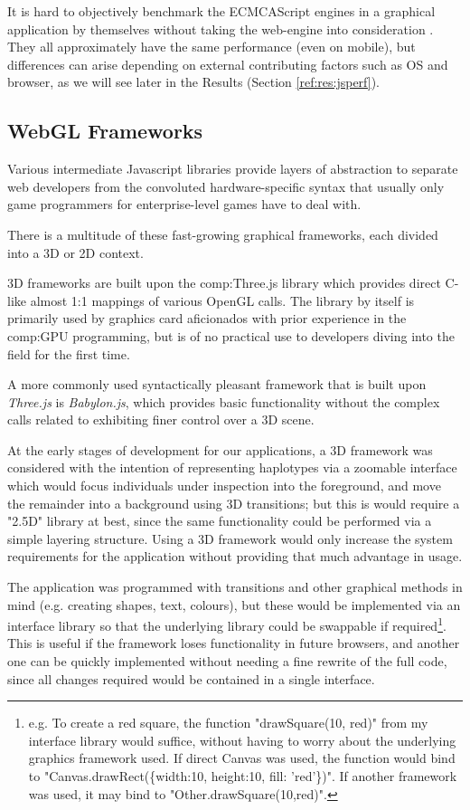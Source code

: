 It is hard to objectively benchmark the ECMCAScript engines in a graphical application by themselves without taking the web-engine into consideration \cite{nielson2008benchmarking}. They all approximately have the same performance (even on mobile)\cite{charland2011mobile}, but differences can arise depending on external contributing factors such as OS and browser, as we will see later in the Results (Section \ref{ref:res:jsperf}).


\subsection{WebGL Frameworks}

Various intermediate Javascript libraries provide layers of abstraction to separate web developers from the convoluted hardware-specific syntax that usually only game programmers for enterprise-level games have to deal with.

There is a multitude of these fast-growing graphical frameworks, each divided into a 3D or 2D context. 

3D frameworks are built upon the \gls{comp:Three.js} library which provides direct C-like almost 1:1 mappings of various OpenGL calls. The library by itself is primarily used by graphics card aficionados with prior experience in the \gls{comp:GPU} programming, but is of no practical use to developers diving into the field for the first time. 

A more commonly used syntactically pleasant framework that is built upon \textit{Three.js} is \textit{Babylon.js}, which provides basic functionality without the complex calls related to exhibiting finer control over a 3D scene.

At the early stages of development for our applications, a 3D framework was considered  with the intention of representing haplotypes via a zoomable interface which would focus individuals under inspection into the foreground, and move the remainder into a background using 3D transitions; but this is would require a "2.5D" library at best, since the same functionality could be performed via a simple layering structure. Using a 3D framework would only increase the system requirements for the application without providing that much advantage in usage.

The application was programmed with transitions and other graphical methods in mind (e.g. creating shapes, text, colours), but these would be implemented via an interface library so that the underlying library could be swappable if required\footnote{e.g. To create a red square, the function "drawSquare(10, red)" from my interface library would suffice, without having to worry about the underlying graphics framework used. If direct Canvas was used, the function would bind to "Canvas.drawRect(\{width:10, height:10, fill: 'red'\})". If another framework was used, it may bind to "Other.drawSquare(10,red)".}. This is useful if the framework loses functionality in future browsers, and another one can be quickly implemented without needing a fine rewrite of the full code, since all changes required would be contained in a single interface.

